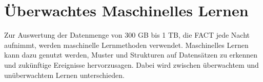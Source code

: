 % 

\chapter{Überwachtes Maschinelles Lernen}
Zur Auswertung der Datenmenge von 300 GB bis 1 TB, die FACT jede Nacht aufnimmt, werden maschinelle Lernmethoden verwendet. 
Maschinelles Lernen kann dazu genutzt werden, Muster und Strukturen auf Datensätzen zu erkennen und zukünftige Ereignisse hervorzusagen. 
Dabei wird zwischen überwachtem und unüberwachtem Lernen unterschieden.

